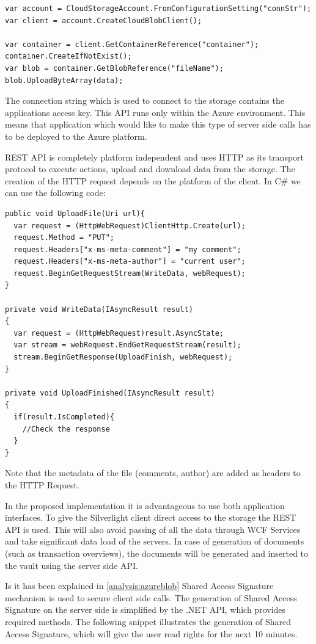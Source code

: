 \begin{verbatim}
var account = CloudStorageAccount.FromConfigurationSetting("connStr");
var client = account.CreateCloudBlobClient();

var container = client.GetContainerReference("container");
container.CreateIfNotExist();
var blob = container.GetBlobReference("fileName");
blob.UploadByteArray(data);
\end{verbatim}

The connection string which is used to connect to the storage contains the applications access key. This API runs only within the Azure environment. This means that application which would like to make this type of server side calls has to be deployed to the Azure platform.

REST API is completely platform independent and uses HTTP as its transport protocol to execute actions, upload and download data from the storage. The creation of the HTTP request depends on the platform of the client. In C\# we can use the following code:

\begin{verbatim}
public void UploadFile(Uri url){
  var request = (HttpWebRequest)ClientHttp.Create(url);
  request.Method = "PUT";
  request.Headers["x-ms-meta-comment"] = "my comment";
  request.Headers["x-ms-meta-author"] = "current user";
  request.BeginGetRequestStream(WriteData, webRequest);
}

private void WriteData(IAsyncResult result)
{
  var request = (HttpWebRequest)result.AsyncState;
  var stream = webRequest.EndGetRequestStream(result);       
  stream.BeginGetResponse(UploadFinish, webRequest);
}

private void UploadFinished(IAsyncResult result)
{
  if(result.IsCompleted){
    //Check the response
  }
}
\end{verbatim}

Note that the metadata of the file (comments, author) are added as headers to the HTTP Request.

In the proposed implementation it is advantageous to use both application interfaces. To give the Silverlight client direct access to the storage the REST API is used. This will also avoid passing of all the data through WCF Services and take significant data load of the servers. In case of generation of documents (such as transaction overviews), the documents will be generated and inserted to the vault using the server side API.

Is it has been explained in \ref{analysis:azureblob} Shared Access Signature mechanism is used to secure client side calls.
The generation of Shared Access Signature on the server side is simplified by the .NET API, which provides required methods. The following snippet illustrates the generation of Shared Access Signature, which will give the user read rights for the next 10 minutes.

